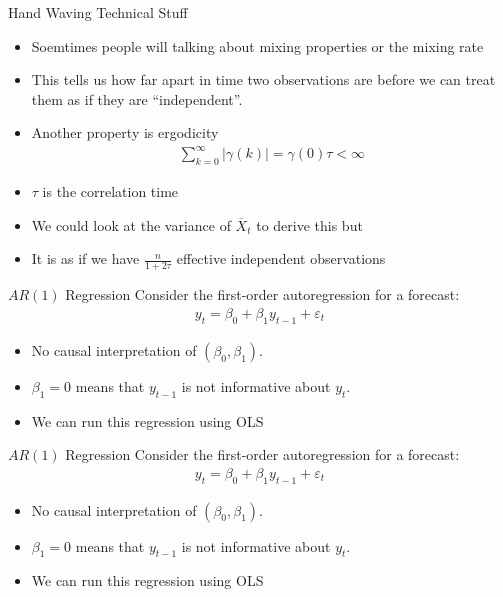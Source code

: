 \begin{frame}{Hand Waving Technical Stuff}
\begin{itemize}
\item Soemtimes people will talking about \alert{mixing properties} or the \alert{mixing rate}
\item This tells us how far apart in time two observations are before we can treat them as if they are ``independent''.
\item Another property is \alert{ergodicity}
\begin{align*}
\sum_{k=0}^{\infty} | \gamma(k)|  = \gamma(0) \tau < \infty
\end{align*}
\item $\tau$ is the \alert{correlation} time
\item We could look at the variance of $\overline{X}_t$ to derive this but
\item It is as if we have $\frac{n}{1+ 2\tau}$ \alert{effective independent observations}
\end{itemize}
\end{frame}

\begin{frame}{$AR(1)$ Regression}
Consider the first-order autoregression for a \alert{forecast}:
\begin{align*}
y_t = \beta_0 + \beta_1 y_{t-1} + \varepsilon_t
\end{align*}
\begin{itemize}
    \item No causal interpretation of $(\beta_0,\beta_1)$.
    \item $\beta_1=0$ means that $y_{t-1}$ is not informative about $y_t$.
    \item We can run this regression using OLS
\end{itemize}
\end{frame}

\begin{frame}{$AR(1)$ Regression}
Consider the first-order autoregression for a \alert{forecast}:
\begin{align*}
y_t = \beta_0 + \beta_1 y_{t-1} + \varepsilon_t
\end{align*}
\begin{itemize}
    \item No causal interpretation of $(\beta_0,\beta_1)$.
    \item $\beta_1=0$ means that $y_{t-1}$ is not informative about $y_t$.
    \item We can run this regression using OLS
\end{itemize}
\end{frame}


